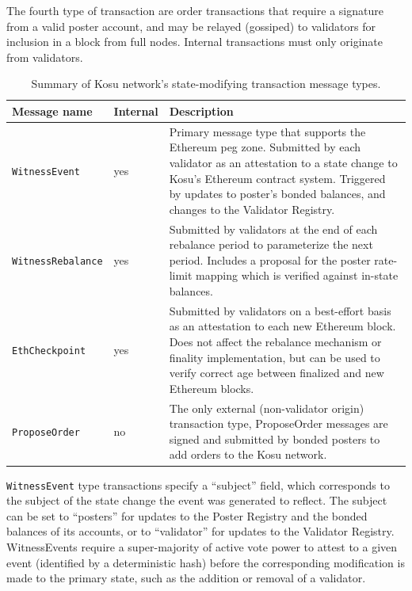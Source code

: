 \documentclass[10pt]{article}
\begin{document}
The fourth type of transaction are order transactions that require a signature from a valid poster account, and may be relayed (gossiped) to validators for inclusion in a block from full nodes. Internal transactions must only originate from validators.

\bgroup
\def\arraystretch{1.2}
\begin{table}[H]
\centering
\label{table:table4}
\begin{tabularx}{1\textwidth}{|l|l|X|}
\hline
\textbf{Message name} & \textbf{Internal} & \textbf{Description} \\
\hline
\texttt{WitnessEvent} & yes & Primary message type that supports the Ethereum peg zone. Submitted by each validator as an attestation to a state change to Kosu’s Ethereum contract system. Triggered by updates to poster’s bonded balances, and changes to the Validator Registry. \\
\hline
\texttt{WitnessRebalance} & yes & Submitted by validators at the end of each rebalance period to parameterize the next period. Includes a proposal for the poster rate-limit mapping which is verified against in-state balances. \\
\hline
\texttt{EthCheckpoint} & yes & Submitted by validators on a best-effort basis as an attestation to each new Ethereum block. Does not affect the rebalance mechanism or finality implementation, but can be used to verify correct age between finalized and new Ethereum blocks. \\
\hline
\texttt{ProposeOrder} & no & The only external (non-validator origin) transaction type, ProposeOrder messages are signed and submitted by bonded posters to add orders to the Kosu network. \\
\hline
\end{tabularx}
\caption{Summary of Kosu network's state-modifying transaction message types.} 
\end{table}
\egroup

\texttt{WitnessEvent} type transactions specify a ``subject'' field, which corresponds to the subject of the state change the event was generated to reflect. The subject can be set to ``posters'' for updates to the Poster Registry and the bonded balances of its accounts, or to ``validator'' for updates to the Validator Registry. WitnessEvents require a super-majority of active vote power to attest to a given event (identified by a deterministic hash) before the corresponding modification is made to the primary state, such as the addition or removal of a validator.
\medskip
\end{document}
